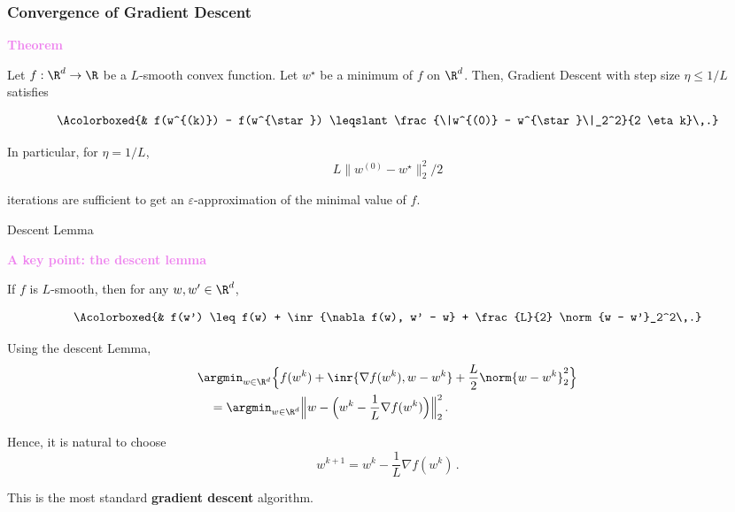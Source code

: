 \documentclass[xcolor={usenames,dvipsnames}]{beamer}
\begin{document}
\begin{frame}
	\frametitle{Convergence of Gradient Descent}
	
\textbf{\textcolor{violet}{Theorem}}

Let $f : \R^d \to \R$ be a \alert{$L$-smooth convex function}. Let $w^{\star}$ be a minimum of $f$ on $\R^d$. Then, Gradient Descent with step size $\eta \leqslant 1/L$ satisfies

\begin{align*}
\Acolorboxed{&
f(w^{(k)}) - f(w^{\star}) \leqslant \frac{\|w^{(0)} - w^{\star}\|_2^2}{2 \eta k}\,.}
\end{align*}


\medskip

In particular, for $\eta=1/L$, 
$$
L\|w^{(0)} - w^{\star}\|_2^2/2
$$
	
\smallskip

iterations are sufficient to get an \alert{$\varepsilon$-approximation of the minimal value of $f$}. 
\end{frame}







\begin{frame}{Descent Lemma}

\textbf{\textcolor{violet}{A \textbf{key} point: the descent lemma}}

If $f$ is \alert{$L$-smooth}, then for any $w, w' \in \R^d$,  

\begin{align*}
\Acolorboxed{&
	f(w') \leq f(w) + \inr{\nabla f(w), w' - w} + \frac {L}{2} \norm{w -
		w'}_2^2\,.}
\end{align*}
 

\bigskip

Using the descent Lemma, 
\begin{align*}
	&\argmin_{w \in \R^d} \Big\{ f(w^k) + \inr{\nabla
		f(w^k), w - w^k} + \frac{L}{2} \norm{w -
		w^k}_2^2 \Big\} \\
	& \quad = \argmin_{w \in \R^d} \Big\| w - \Big(
	w^k - \frac 1 {L} \nabla f(w^k) \Big) \Big\|_2^2\,.
\end{align*}


Hence, it is natural to choose
\begin{equation*}
	w^{k+1} = w^k - \frac 1 {L} \nabla f(w^k)\,.
\end{equation*}

This is the most standard \textbf{gradient descent} algorithm.


\end{frame}
\end{document}
